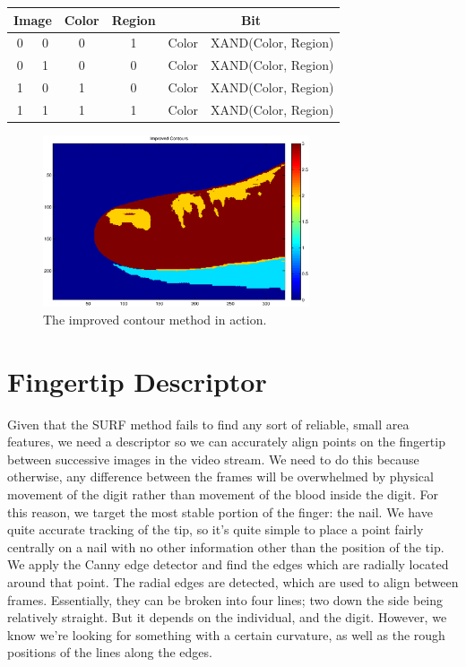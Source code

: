 \begin{center}
\begin{tabular}{|c|c|c|c||c|c|}
\hline
\multicolumn{2}{|c|}{Image} & Color & Region & \multicolumn{2}{|c|}{Bit}\\\hline
0 & 0 & 0 & 1 & Color & XAND(Color, Region)\\\hline
0 & 1 & 0 & 0 & Color & XAND(Color, Region)\\\hline
1 & 0 & 1 & 0 & Color & XAND(Color, Region)\\\hline
1 & 1 & 1 & 1 & Color & XAND(Color, Region)\\\hline
\end{tabular}
\end{center}

\begin{figure}[h!]
  \centering
    \includegraphics[width=0.70\textwidth]{Chapter2/Figs/2bitImage.eps}
    \caption{The improved contour method in action.}\label{fig:2BitImage}
\end{figure}

\section{Fingertip Descriptor}\label{sec:FingertipDescriptor}

Given that the SURF method fails to find any sort of reliable, small area features, we need a descriptor so we can accurately align points on the fingertip between successive images in the video stream. We need to do this because otherwise, any difference between the frames will be overwhelmed by physical movement of the digit rather than movement of the blood inside the digit. For this reason, we target the most stable portion of the finger: the nail. We have quite accurate tracking of the tip, so it's quite simple to place a point fairly centrally on a nail with no other information other than the position of the tip. We apply the Canny edge detector and find the edges which are radially located around that point. The radial edges are detected, which are used to align between frames. Essentially, they can be broken into four lines; two down the side being relatively straight. But it depends on the individual, and the digit. However, we know we're looking for something with a certain curvature, as well as the rough positions of the lines along the edges.

